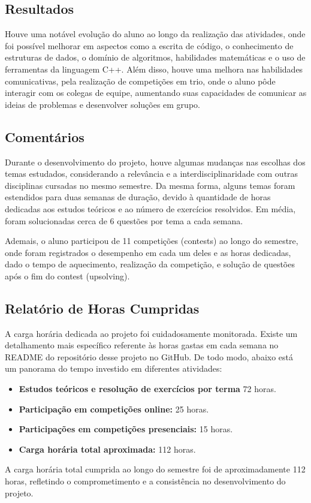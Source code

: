 \documentclass{article}
\begin{document}
\subsection{Resultados}
\hspace{1cm} Houve uma notável evolução do aluno ao longo da realização das atividades, onde foi possível melhorar em aspectos como a escrita de código, o conhecimento de estruturas de dados, o domínio de algoritmos, habilidades matemáticas e o uso de ferramentas da linguagem C++. Além disso, houve uma melhora nas habilidades comunicativas, pela realização de competições em trio, onde o aluno pôde interagir com os colegas de equipe, aumentando suas capacidades de comunicar as ideias de problemas e desenvolver soluções em grupo.

\subsection{Comentários}
\hspace{1cm}  Durante o desenvolvimento do projeto, houve algumas mudanças nas escolhas dos temas estudados, considerando a relevância e a interdisciplinaridade com outras disciplinas cursadas no mesmo semestre. Da mesma forma, alguns temas foram estendidos para duas semanas de duração, devido à quantidade de horas dedicadas aos estudos teóricos e ao número de exercícios resolvidos. Em média, foram solucionadas cerca de 6 questões por tema a cada semana.

\hspace{1cm}Ademais, o aluno participou de 11 competições (contests) ao longo do semestre, onde foram registrados o desempenho em cada um deles e as horas dedicadas, dado o tempo de aquecimento, realização da competição, e solução de questões após o fim do contest (upsolving).


\subsection{Relatório de Horas Cumpridas}
A carga horária dedicada ao projeto foi cuidadosamente monitorada. Existe um detalhamento mais específico referente às horas gastas em cada semana no README do repositório desse projeto no GitHub. De todo modo, abaixo está um panorama do tempo investido em diferentes atividades:

\begin{itemize}
    \item \textbf{Estudos teóricos e resolução de exercícios por terma} 72 horas.
    \item \textbf{Participação em competições online:} 25 horas.
    \item \textbf{Participações em competições presenciais:} 15 horas.
    \item \textbf{Carga horária total aproximada:} 112 horas.
\end{itemize}

A carga horária total cumprida ao longo do semestre foi de aproximadamente 112 horas, refletindo o comprometimento e a consistência no desenvolvimento do projeto.
\end{document}

